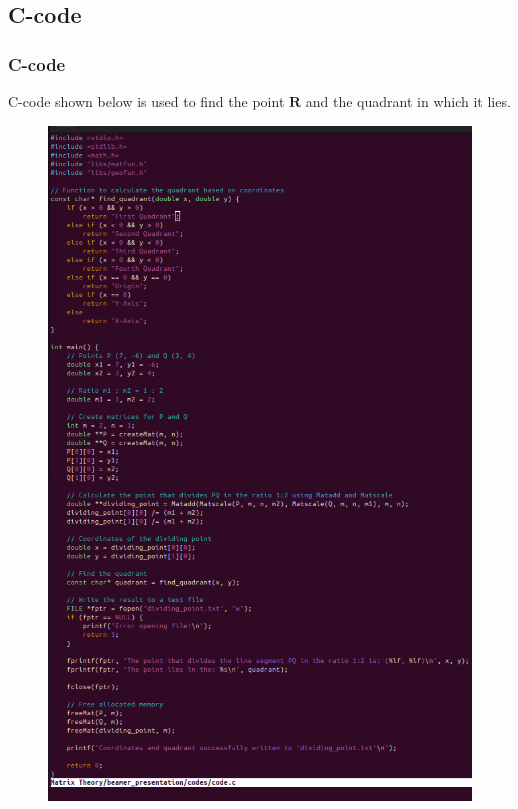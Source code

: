 \documentclass{beamer}
\theoremstyle{remark}
\let\vec\mathbf
\numberwithin{equation}{section}
\begin{document}
\subsection{C-code}
\begin{frame}
\frametitle{C-code}
	C-code shown below is used to find the point $\vec{R}$ and the quadrant in which it lies.
             	\begin{figure}[H]
	\centering
				\begin{minipage}{0.5\textwidth}
	\includegraphics[width=0.7\linewidth]{figs/C-code.png}
			\end{minipage}
			\end{figure} 

\end{frame}
\end{document}
